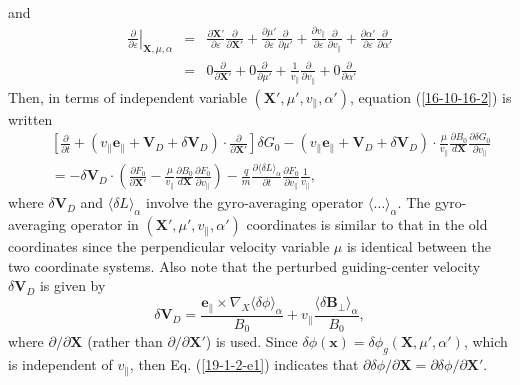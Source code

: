 \documentclass{llncs}
\begin{document}
and
\begin{eqnarray}
  \left. \frac{\partial}{\partial \varepsilon} \right|_{\mathbf{X}, \mu,
  \alpha} & = & \frac{\partial \mathbf{X}'}{\partial \varepsilon}
  \frac{\partial}{\partial \mathbf{X}'} + \frac{\partial \mu'}{\partial
  \varepsilon} \frac{\partial}{\partial \mu'} + \frac{\partial
  v_{\parallel}}{\partial \varepsilon} \frac{\partial}{\partial v_{\parallel}}
  + \frac{\partial \alpha'}{\partial \varepsilon} \frac{\partial}{\partial
  \alpha'} \nonumber\\
  & = & 0 \frac{\partial}{\partial \mathbf{X}'} + 0 \frac{\partial}{\partial
  \mu'} + \frac{1}{v_{\parallel}}  \frac{\partial}{\partial v_{\parallel}} + 0
  \frac{\partial}{\partial \alpha'} 
\end{eqnarray}
Then, in terms of independent variable $(\mathbf{X}', \mu', v_{\parallel},
\alpha')$, equation (\ref{16-10-16-2}) is written
\begin{eqnarray}
  &  & \left[ \frac{\partial}{\partial t} + (v_{\parallel}
  \mathbf{e}_{\parallel} +\mathbf{V}_D + \delta \mathbf{V}_D) \cdot
  \frac{\partial}{\partial \mathbf{X}'} \right] \delta G_0 - (v_{\parallel}
  \mathbf{e}_{\parallel} +\mathbf{V}_D + \delta \mathbf{V}_D) \cdot
  \frac{\mu}{v_{\parallel}}  \frac{\partial B_0}{d\mathbf{X}} \frac{\partial
  \delta G_0}{\partial v_{\parallel}} \nonumber\\
  &  & = - \delta \mathbf{V}_D \cdot \left( \frac{\partial F_0}{\partial
  \mathbf{X}'} - \frac{\mu}{v_{\parallel}}  \frac{\partial B_0}{d\mathbf{X}}
  \frac{\partial F_0}{\partial v_{\parallel}} \right) - \frac{q}{m} 
  \frac{\partial \langle \delta L \rangle_{\alpha}}{\partial t} 
  \frac{\partial F_0}{\partial v_{\parallel}}  \frac{1}{v_{\parallel}}, 
  \label{18-12-17-3}
\end{eqnarray}
where $\delta \mathbf{V}_D$ and $\langle \delta L \rangle_{\alpha}$ involve
the gyro-averaging operator $\langle \ldots \rangle_{\alpha}$. The
gyro-averaging operator in $(\mathbf{X}', \mu', v_{\parallel}, \alpha')$
coordinates is similar to that in the old coordinates since the perpendicular
velocity variable $\mu$ is identical between the two coordinate systems. Also
note that the perturbed guiding-center velocity $\delta \mathbf{V}_D$ is given
by
\begin{equation}
  \delta \mathbf{V}_D = \frac{\mathbf{e}_{\parallel} \times \nabla_X \langle
  \delta \phi \rangle_{\alpha}}{B_0} + v_{\parallel} \frac{\langle \delta
  \mathbf{B}_{\perp} \rangle_{\alpha}}{B_0},
\end{equation}
where $\partial / \partial \mathbf{X}$ (rather than $\partial / \partial
\mathbf{X}'$) is used. Since $\delta \phi (\mathbf{x}) = \delta \phi_g
(\mathbf{X}, \mu', \alpha')$, which is independent of $v_{\parallel}$, then
Eq. (\ref{19-1-2-e1}) indicates that $\partial \delta \phi / \partial
\mathbf{X}= \partial \delta \phi / \partial \mathbf{X}'$.
\end{document}
